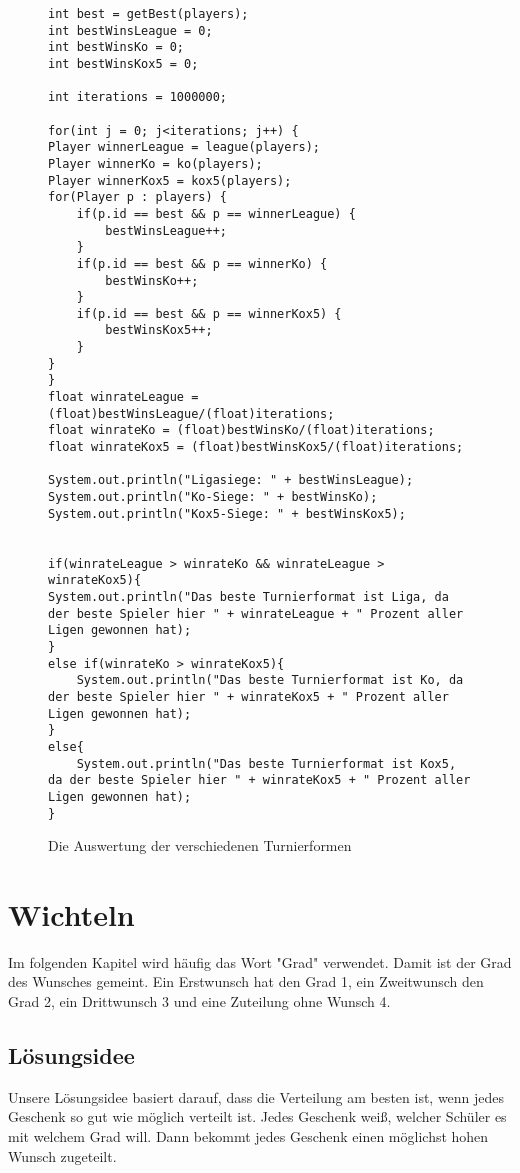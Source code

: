 \documentclass[a4paper, 12pt]{scrartcl}
\begin{document}
\begin{figure}[H]
\centering
\begin{lstlisting}
int best = getBest(players);
int bestWinsLeague = 0;
int bestWinsKo = 0;
int bestWinsKox5 = 0;

int iterations = 1000000;

for(int j = 0; j<iterations; j++) {
Player winnerLeague = league(players);
Player winnerKo = ko(players);
Player winnerKox5 = kox5(players);
for(Player p : players) {
    if(p.id == best && p == winnerLeague) {
        bestWinsLeague++;
    }
    if(p.id == best && p == winnerKo) {
        bestWinsKo++;
    }
    if(p.id == best && p == winnerKox5) {
        bestWinsKox5++;
    }
}
}
float winrateLeague = (float)bestWinsLeague/(float)iterations;
float winrateKo = (float)bestWinsKo/(float)iterations;
float winrateKox5 = (float)bestWinsKox5/(float)iterations;

System.out.println("Ligasiege: " + bestWinsLeague);
System.out.println("Ko-Siege: " + bestWinsKo);
System.out.println("Kox5-Siege: " + bestWinsKox5);


if(winrateLeague > winrateKo && winrateLeague > winrateKox5){
System.out.println("Das beste Turnierformat ist Liga, da der beste Spieler hier " + winrateLeague + " Prozent aller Ligen gewonnen hat);
}
else if(winrateKo > winrateKox5){
    System.out.println("Das beste Turnierformat ist Ko, da der beste Spieler hier " + winrateKox5 + " Prozent aller Ligen gewonnen hat);
}
else{
    System.out.println("Das beste Turnierformat ist Kox5, da der beste Spieler hier " + winrateKox5 + " Prozent aller Ligen gewonnen hat);
}

\end{lstlisting}
\caption{Die Auswertung der verschiedenen Turnierformen}
\end{figure}

\section{Wichteln}

Im folgenden Kapitel wird häufig das Wort "Grad" verwendet. Damit ist der Grad des Wunsches gemeint. Ein Erstwunsch hat den Grad 1, ein Zweitwunsch den Grad 2, ein Drittwunsch 3 und eine Zuteilung ohne Wunsch 4.

\subsection{Lösungsidee}

Unsere Lösungsidee basiert darauf, dass die Verteilung am besten ist, wenn jedes Geschenk so gut wie möglich verteilt ist. Jedes Geschenk weiß, welcher Schüler es mit welchem Grad will. Dann bekommt jedes Geschenk einen möglichst hohen Wunsch zugeteilt.
\end{document}
